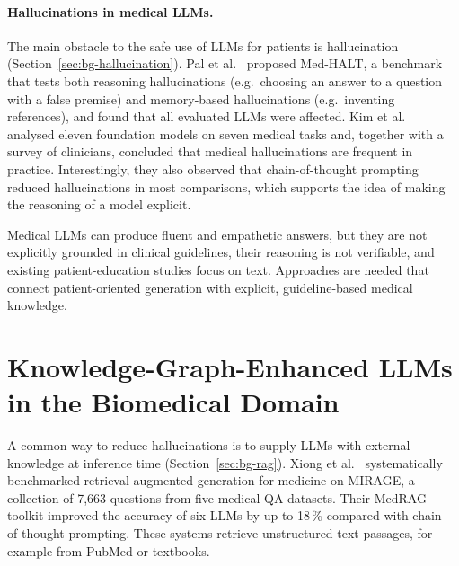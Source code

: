 \paragraph{Hallucinations in medical LLMs.}
The main obstacle to the safe use of LLMs for patients is hallucination
(Section~\ref{sec:bg-hallucination}). Pal et al.~\cite{pal2023medhalt}
proposed Med-HALT, a benchmark that tests both reasoning hallucinations (e.g.\
choosing an answer to a question with a false premise) and memory-based
hallucinations (e.g.\ inventing references), and found that all evaluated
LLMs were affected. Kim et al.~\cite{kim2025medicalhallucinationsfoundationmodels}
analysed eleven foundation models on seven medical tasks and, together with a
survey of clinicians, concluded that medical hallucinations are frequent in
practice. Interestingly, they also observed that chain-of-thought prompting
reduced hallucinations in most comparisons, which supports the idea of making
the reasoning of a model explicit.

\begin{rwgap}
Medical LLMs can produce fluent and empathetic answers, but they are not
explicitly grounded in clinical guidelines, their reasoning is not
verifiable, and existing patient-education studies focus on text.
Approaches are needed that connect patient-oriented generation with
explicit, guideline-based medical knowledge.
\end{rwgap}

\section{Knowledge-Graph-Enhanced LLMs in the Biomedical Domain}
\label{sec:rw-kg-llm}

A common way to reduce hallucinations is to supply LLMs with external
knowledge at inference time (Section~\ref{sec:bg-rag}). Xiong et
al.~\cite{xiong2024benchmarking} systematically benchmarked
retrieval-augmented generation for medicine on MIRAGE, a collection of 7,663
questions from five medical QA datasets. Their MedRAG toolkit improved the
accuracy of six LLMs by up to 18\,\% compared with chain-of-thought prompting.
These systems retrieve unstructured text passages, for example from PubMed or
textbooks.

